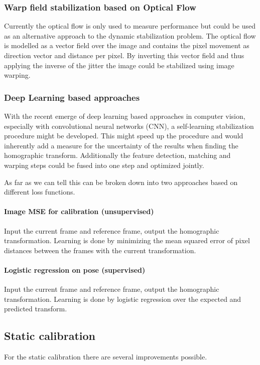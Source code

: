 \subsubsection{Warp field stabilization based on Optical Flow}
Currently the optical flow is only used to measure performance but could be used as an alternative approach to the dynamic stabilization problem.
The optical flow is modelled as a vector field over the image and contains the pixel movement as direction vector and distance per pixel.
By inverting this vector field and thus applying the inverse of the jitter the image could be stabilized using image warping.  

\subsubsection{Deep Learning based approaches}
With the recent emerge of deep learning based approaches in computer vision, especially with convolutional neural networks (CNN), a self-learning stabilization procedure might be developed.
This might speed up the procedure and would inherently add a measure for the uncertainty of the results when finding the homographic transform.
Additionally the feature detection, matching and warping steps could be fused into one step and optimized jointly.

As far as we can tell this can be broken down into two approaches based on different loss functions.

\paragraph{Image MSE for calibration (unsupervised)}
Input the current frame and reference frame, output the homographic transformation. 
Learning is done by minimizing the mean squared error of pixel distances between the frames with the current transformation.

\paragraph{Logistic regression on pose (supervised)}
Input the current frame and reference frame, output the homographic transformation. 
Learning is done by logistic regression over the expected and predicted transform.

\subsection{Static calibration}
For the static calibration there are several improvements possible.

